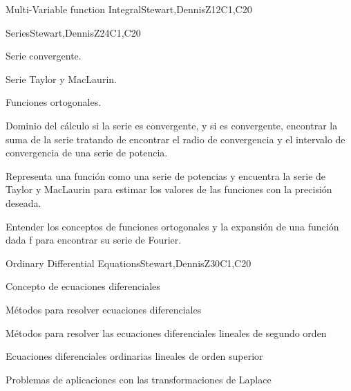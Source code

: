 \begin{syllabus}
\begin{unit}{Multi-Variable function Integral}{}{Stewart,DennisZ}{12}{C1,C20}
\begin{learningoutcomes}
    \end{learningoutcomes}

\end{unit}

\begin{unit}{Series}{}{Stewart,DennisZ}{24}{C1,C20}
   \begin{topics}
    \item Serie convergente.
    \item Serie Taylor y MacLaurin.
    \item Funciones ortogonales.
 \end{topics}

   \begin{learningoutcomes}
    \item Dominio del cálculo si la serie es convergente, y si es convergente, encontrar la suma de la serie tratando de encontrar el radio de convergencia y el intervalo de convergencia de una serie de potencia.
    \item Representa una función como una serie de potencias y encuentra la serie de Taylor y MacLaurin para estimar los valores de las funciones con la precisión deseada.
    \item Entender los conceptos de funciones ortogonales y la expansión de una función dada f para encontrar su serie de Fourier.
     \end{learningoutcomes}
\end{unit}

\begin{unit}{Ordinary Differential Equations}{}{Stewart,DennisZ}{30}{C1,C20}
   \begin{topics}
    \item Concepto de ecuaciones diferenciales
    \item Métodos para resolver ecuaciones diferenciales
    \item Métodos para resolver las ecuaciones diferenciales lineales de segundo orden
    \item Ecuaciones diferenciales ordinarias lineales de orden superior
    \item Problemas de aplicaciones con las transformaciones de Laplace
      \end{topics}


\end{unit}
\end{syllabus}
